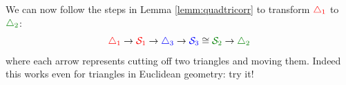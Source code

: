 We can now follow the steps in Lemma \ref{lemm:quadtricorr} to transform $\textcolor{red}{\triangle_1}$ to $\textcolor{Green}{\triangle_2}$:
\[\textcolor{red}{\triangle_1}\to \textcolor{red}{\cS_1}\to \textcolor{blue}{\triangle_3}\to \textcolor{blue}{\cS_3}\cong \textcolor{Green}{\cS_2}\to \textcolor{Green}{\triangle_2}\]
where each arrow represents cutting off two triangles and moving them. Indeed this works even for triangles in Euclidean geometry: try it!

\goodbreak


